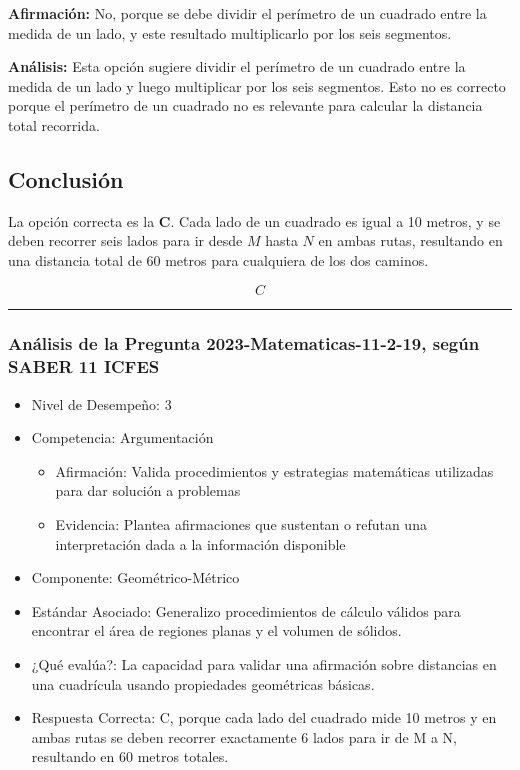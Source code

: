 \documentclass[
]{article}
\providecommand{\tightlist}{%
  \setlength{\itemsep}{0pt}\setlength{\parskip}{0pt}}
\begin{document}
\textbf{Afirmación:} No, porque se debe dividir el perímetro de un
cuadrado entre la medida de un lado, y este resultado multiplicarlo por
los seis segmentos.

\textbf{Análisis:} Esta opción sugiere dividir el perímetro de un
cuadrado entre la medida de un lado y luego multiplicar por los seis
segmentos. Esto no es correcto porque el perímetro de un cuadrado no es
relevante para calcular la distancia total recorrida.

\subsection{Conclusión}\label{conclusiuxf3n-14}

La opción correcta es la \textbf{C}. Cada lado de un cuadrado es igual a
10 metros, y se deben recorrer seis lados para ir desde \(M\) hasta
\(N\) en ambas rutas, resultando en una distancia total de 60 metros
para cualquiera de los dos caminos.

\[ \boxed{C} \]

\begin{center}\rule{0.5\linewidth}{0.5pt}\end{center}

\subsubsection{Análisis de la Pregunta 2023-Matematicas-11-2-19, según
SABER 11
ICFES}\label{anuxe1lisis-de-la-pregunta-2023-matematicas-11-2-19-seguxfan-saber-11-icfes}

\begin{itemize}
\tightlist
\item
  Nivel de Desempeño: 3
\item
  Competencia: Argumentación

  \begin{itemize}
  \tightlist
  \item
    Afirmación: Valida procedimientos y estrategias matemáticas
    utilizadas para dar solución a problemas
  \item
    Evidencia: Plantea afirmaciones que sustentan o refutan una
    interpretación dada a la información disponible
  \end{itemize}
\item
  Componente: Geométrico-Métrico
\item
  Estándar Asociado: Generalizo procedimientos de cálculo válidos para
  encontrar el área de regiones planas y el volumen de sólidos.
\item
  ¿Qué evalúa?: La capacidad para validar una afirmación sobre
  distancias en una cuadrícula usando propiedades geométricas básicas.
\item
  Respuesta Correcta: C, porque cada lado del cuadrado mide 10 metros y
  en ambas rutas se deben recorrer exactamente 6 lados para ir de M a N,
  resultando en 60 metros totales.
\end{itemize}
\end{document}
